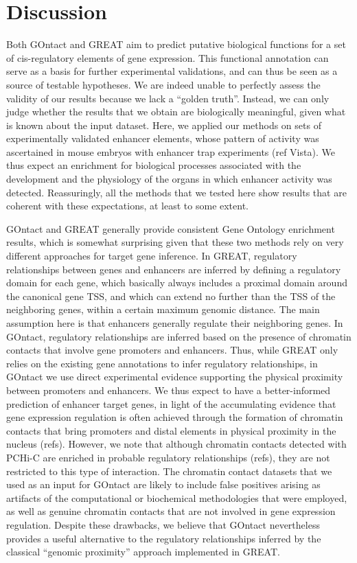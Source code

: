 \section{Discussion}
Both GOntact and GREAT aim to predict putative biological functions for a set of \acrshort{cis}-regulatory elements of gene expression. This functional annotation can serve as a basis for further experimental validations, and can thus be seen as a source of testable hypotheses. We are indeed unable to perfectly assess the validity of our results because we lack a “golden truth”. Instead, we can only judge whether the results that we obtain are biologically meaningful, given what is known about the input dataset. Here, we applied our methods on sets of experimentally validated enhancer elements, whose pattern of activity was ascertained in mouse embryos with enhancer trap experiments (ref Vista). We thus expect an enrichment for biological processes associated with the development and the physiology of the organs in which enhancer activity was detected. Reassuringly, all the methods that we tested here show results that are coherent with these expectations, at least to some extent.  

GOntact and GREAT generally provide consistent Gene Ontology enrichment results, which is somewhat surprising given that these two methods rely on very different approaches for target gene inference. In GREAT, regulatory relationships between genes and enhancers are inferred by defining a regulatory domain for each gene, which basically always includes a proximal domain around the canonical gene TSS, and which can extend no further than the TSS of the neighboring genes, within a certain maximum genomic distance. The main assumption here is that enhancers generally regulate their neighboring genes. In GOntact, regulatory relationships are inferred based on the presence of chromatin contacts that involve gene promoters and enhancers. Thus, while GREAT only relies on the existing gene annotations to infer regulatory relationships, in GOntact we use direct experimental evidence supporting the physical proximity between promoters and enhancers. We thus expect to have a better-informed prediction of enhancer target genes, in light of the accumulating evidence that gene expression regulation is often achieved through the formation of chromatin contacts that bring promoters and distal elements in physical proximity in the nucleus (refs). However, we note that although chromatin contacts detected with PCHi-C are enriched in probable regulatory relationships (refs), they are not restricted to this type of interaction. The chromatin contact datasets that we used as an input for GOntact are likely to include false positives arising as artifacts of the computational or biochemical methodologies that were employed, as well as genuine chromatin contacts that are not involved in gene expression regulation. Despite these drawbacks, we believe that GOntact nevertheless provides a useful alternative to the regulatory relationships inferred by the classical “genomic proximity” approach implemented in GREAT. \\

